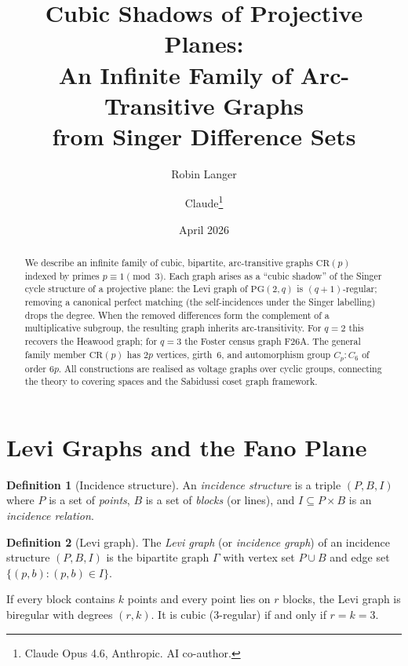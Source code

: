 \documentclass[11pt]{article}
\title{Cubic Shadows of Projective Planes:\\
An Infinite Family of Arc-Transitive Graphs\\from Singer Difference Sets}
\author{Robin Langer \and Claude\footnote{Claude Opus 4.6, Anthropic. AI co-author.}}
\date{April 2026}
\theoremstyle{definition}
\newtheorem{definition}{Definition}
\begin{document}
\maketitle

\begin{abstract}
We describe an infinite family of cubic, bipartite, arc-transitive graphs $\mathrm{CR}(p)$ indexed by primes $p \equiv 1 \pmod{3}$.
Each graph arises as a ``cubic shadow'' of the Singer cycle structure of a projective plane:
the Levi graph of $\mathrm{PG}(2,q)$ is $(q{+}1)$-regular; removing a canonical perfect matching
(the self-incidences under the Singer labelling) drops the degree.
When the removed differences form the complement of a multiplicative subgroup,
the resulting graph inherits arc-transitivity.
For $q = 2$ this recovers the Heawood graph; for $q = 3$ the Foster census graph F26A.
The general family member $\mathrm{CR}(p)$ has $2p$ vertices, girth~6, and automorphism group $C_p {:} C_6$ of order $6p$.
All constructions are realised as voltage graphs over cyclic groups, connecting the theory
to covering spaces and the Sabidussi coset graph framework.
\end{abstract}

\tableofcontents

\section{Levi Graphs and the Fano Plane}

\begin{definition}[Incidence structure]
An \emph{incidence structure} is a triple $(P, B, I)$ where $P$ is a set of \emph{points},
$B$ is a set of \emph{blocks} (or lines), and $I \subseteq P \times B$ is an \emph{incidence relation}.
\end{definition}

\begin{definition}[Levi graph]
The \emph{Levi graph} (or \emph{incidence graph}) of an incidence structure $(P, B, I)$ is the bipartite graph $\Gamma$
with vertex set $P \cup B$ and edge set $\{(p, b) : (p, b) \in I\}$.
\end{definition}

If every block contains $k$ points and every point lies on $r$ blocks,
the Levi graph is biregular with degrees $(r, k)$.
It is cubic (3-regular) if and only if $r = k = 3$.
\end{document}
